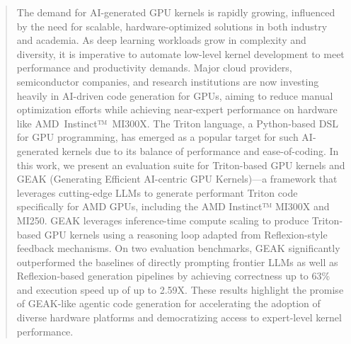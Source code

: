 \begin{abstract}

The demand for AI-generated GPU kernels is rapidly growing, influenced by the need for scalable, hardware-optimized solutions in both industry and academia. As deep learning workloads grow in complexity and diversity, it is imperative to automate low-level kernel development to meet performance and productivity demands. Major cloud providers, semiconductor companies, and research institutions are now investing heavily in AI-driven code generation for GPUs, aiming to reduce manual optimization efforts while achieving near-expert performance on hardware like AMD~Instinct™~MI300X. The Triton language, a Python-based DSL for GPU programming, has emerged as a popular target for such AI-generated kernels due to its balance of performance and ease-of-coding. In this work, we present an evaluation suite for Triton-based GPU kernels and GEAK (Generating Efficient AI-centric GPU Kernels)—a framework that leverages cutting-edge LLMs to generate performant Triton code specifically for AMD GPUs, including the AMD Instinct™ MI300X and MI250. GEAK leverages inference-time compute scaling to produce Triton-based GPU kernels using a reasoning loop adapted from Reflexion-style feedback mechanisms. On two evaluation benchmarks, GEAK significantly outperformed the baselines of directly prompting frontier LLMs as well as Reflexion-based generation pipelines by achieving correctness up to $63$\% and execution speed up of up to 2.59X. These results highlight the promise of GEAK-like agentic code generation for accelerating the adoption of diverse hardware platforms and democratizing access to expert-level kernel performance.


\end{abstract}